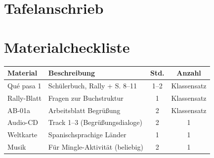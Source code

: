 \documentclass[11pt,a4paper]{article}
\begin{document}
\vspace{1em}

\section*{Tafelanschrieb}

\begin{center}
\end{center}

\vspace{1em}

\section*{Materialcheckliste}

\begin{tabularx}{\textwidth}{|l|X|c|c|}
\hline
\textbf{Material} & \textbf{Beschreibung} & \textbf{Std.} & \textbf{Anzahl} \\
\hline
Qué pasa 1 & Schülerbuch, Rally + S. 8--11 & 1--2 & Klassensatz \\
\hline
Rally-Blatt & Fragen zur Buchstruktur & 1 & Klassensatz \\
\hline
AB-01a & Arbeitsblatt Begrüßung & 2 & Klassensatz \\
\hline
Audio-CD & Track 1--3 (Begrüßungsdialoge) & 2 & 1 \\
\hline
Weltkarte & Spanischsprachige Länder & 1 & 1 \\
\hline
Musik & Für Mingle-Aktivität (beliebig) & 2 & 1 \\
\hline
\end{tabularx}
\end{document}
